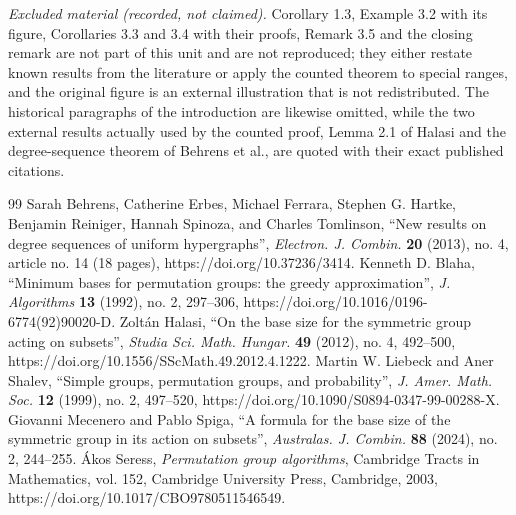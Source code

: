 \documentclass[10pt,a4paper]{amsart}
\theoremstyle{plain}
\theoremstyle{definition}
\theoremstyle{remark}
\begin{document}
\noindent\textit{Excluded material (recorded, not claimed).} Corollary 1.3, Example 3.2 with its figure, Corollaries 3.3 and 3.4 with their proofs, Remark 3.5 and the closing remark are not part of this unit and are not reproduced; they either restate known results from the literature or apply the counted theorem to special ranges, and the original figure is an external illustration that is not redistributed. The historical paragraphs of the introduction are likewise omitted, while the two external results actually used by the counted proof, Lemma 2.1 of Halasi and the degree-sequence theorem of Behrens et al., are quoted with their exact published citations.
\begin{thebibliography}{99}
 Sarah Behrens, Catherine Erbes, Michael Ferrara, Stephen G. Hartke, Benjamin Reiniger, Hannah Spinoza, and Charles Tomlinson, ``New results on degree sequences of uniform hypergraphs'', \emph{Electron. J. Combin.} \textbf{20} (2013), no. 4, article no. 14 (18 pages), https://doi.org/10.37236/3414.
 Kenneth D. Blaha, ``Minimum bases for permutation groups: the greedy approximation'', \emph{J. Algorithms} \textbf{13} (1992), no. 2, 297--306, https://doi.org/10.1016/0196-6774(92)90020-D.
 Zolt\'an Halasi, ``On the base size for the symmetric group acting on subsets'', \emph{Studia Sci. Math. Hungar.} \textbf{49} (2012), no. 4, 492--500, https://doi.org/10.1556/SScMath.49.2012.4.1222.
 Martin W. Liebeck and Aner Shalev, ``Simple groups, permutation groups, and probability'', \emph{J. Amer. Math. Soc.} \textbf{12} (1999), no. 2, 497--520, https://doi.org/10.1090/S0894-0347-99-00288-X.
 Giovanni Mecenero and Pablo Spiga, ``A formula for the base size of the symmetric group in its action on subsets'', \emph{Australas. J. Combin.} \textbf{88} (2024), no. 2, 244--255.
 \'Akos Seress, \emph{Permutation group algorithms}, Cambridge Tracts in Mathematics, vol. 152, Cambridge University Press, Cambridge, 2003, https://doi.org/10.1017/CBO9780511546549.
\end{thebibliography}
\end{document}
